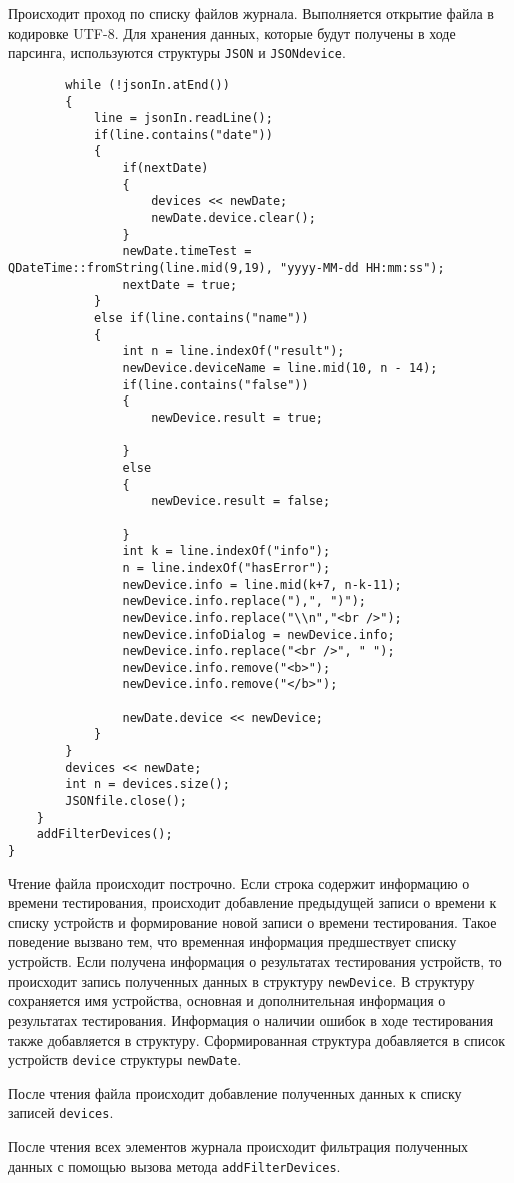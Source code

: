 Происходит проход по списку файлов журнала. Выполняется открытие файла в кодировке UTF-8. Для хранения данных, которые
будут получены в ходе парсинга, используются структуры \texttt{JSON} и \texttt{JSONdevice}.
\medskip
\begin{verbatim}
		while (!jsonIn.atEnd())
		{
			line = jsonIn.readLine();
			if(line.contains("date"))
			{
				if(nextDate)
				{
					devices << newDate;
					newDate.device.clear();
				}
				newDate.timeTest = QDateTime::fromString(line.mid(9,19), "yyyy-MM-dd HH:mm:ss");
				nextDate = true;
			}
			else if(line.contains("name"))
			{
				int n = line.indexOf("result");
				newDevice.deviceName = line.mid(10, n - 14);
				if(line.contains("false"))
				{
					newDevice.result = true;

				}
				else
				{
					newDevice.result = false;

				}
				int k = line.indexOf("info");
				n = line.indexOf("hasError");
				newDevice.info = line.mid(k+7, n-k-11);
				newDevice.info.replace("),", ")");
				newDevice.info.replace("\\n","<br />");
				newDevice.infoDialog = newDevice.info;
				newDevice.info.replace("<br />", " ");
				newDevice.info.remove("<b>");
				newDevice.info.remove("</b>");

				newDate.device << newDevice;
			}
		}
		devices << newDate;
		int n = devices.size();
		JSONfile.close();
	}
	addFilterDevices();
}
\end{verbatim}
\medskip

Чтение файла происходит построчно.
Если строка содержит информацию о времени тестирования, происходит добавление предыдущей
записи о времени к списку устройств и формирование новой записи о времени тестирования. Такое поведение вызвано тем, что
временная информация предшествует списку устройств. Если получена информация о результатах тестирования устройств, то
происходит запись полученных данных в структуру \texttt{newDevice}. В структуру сохраняется имя устройства, основная и
дополнительная информация о результатах тестирования. Информация о наличии ошибок в ходе тестирования также добавляется
в структуру. Сформированная структура добавляется в список устройств \texttt{device} структуры \texttt{newDate}.

После чтения файла происходит добавление полученных данных к списку записей \texttt{devices}.

После чтения всех элементов журнала происходит фильтрация полученных данных с помощью вызова метода
\texttt{addFilterDevices}.

